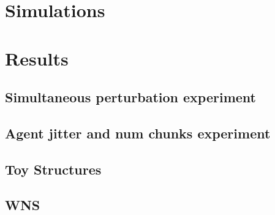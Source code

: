 \documentclass[11pt]{article}
\begin{document}
\section{Simulations}
\label{sec-4}



\section{Results}
\label{sec-5}

\subsection{Simultaneous perturbation experiment}
\label{sec-5-1}

\subsection{Agent jitter and num chunks experiment}
\label{sec-5-2}

\subsection{Toy Structures}
\label{sec-5-3}

\subsection{WNS}
\label{sec-5-4}
\end{document}
